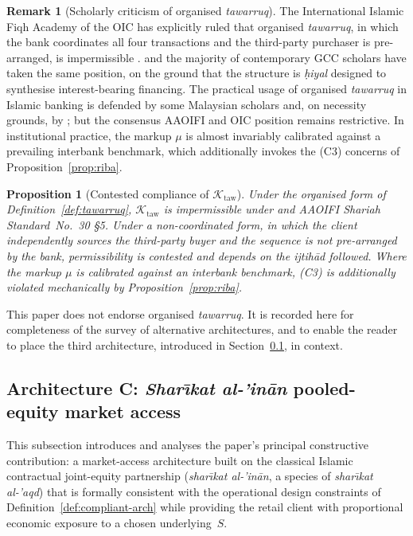 \documentclass[preprint,12pt,authoryear]{elsarticle}
\newtheorem{proposition}{Proposition}[section]
\theoremstyle{definition}
\newtheorem{remark}{Remark}[section]
\begin{document}
\begin{remark}[Scholarly criticism of organised \emph{tawarruq}]
\label{rem:tawarruq-criticism}
The International Islamic Fiqh Academy of the OIC has explicitly
ruled that organised \emph{tawarruq}, in which the bank
coordinates all four transactions and the third-party purchaser is
pre-arranged, is impermissible \citep{OICFiqh179}.
\citet{Usmani2002} and the majority of contemporary GCC scholars
have taken the same position, on the ground that the structure is
\emph{\d{h}iyal} designed to synthesise interest-bearing financing.
The practical usage of organised \emph{tawarruq} in Islamic banking
is defended by some Malaysian scholars and, on necessity grounds,
by \citet{AlSuwailem2006}; but the consensus AAOIFI and OIC
position remains restrictive. In institutional practice, the
markup $\mu$ is almost invariably calibrated against a prevailing
interbank benchmark, which additionally invokes the (C3)
concerns of Proposition~\ref{prop:riba}.
\end{remark}

\begin{proposition}[Contested compliance of
    $\mathcal{K}_{\text{taw}}$]
\label{prop:tawarruq-comply}
Under the organised form of Definition~\ref{def:tawarruq},
$\mathcal{K}_{\text{taw}}$ is impermissible under
\citet{OICFiqh179} and AAOIFI Shariah Standard~No.~30 \S5. Under a
non-coordinated form, in which the client independently sources
the third-party buyer and the sequence is not pre-arranged by the
bank, permissibility is contested and depends on the
\emph{ijtih\={a}d} followed. Where the markup $\mu$ is calibrated
against an interbank benchmark, (C3) is additionally violated
mechanically by Proposition~\ref{prop:riba}.
\end{proposition}

This paper does not endorse organised \emph{tawarruq}. It is
recorded here for completeness of the survey of alternative
architectures, and to enable the reader to place the third
architecture, introduced in Section~\ref{sec:alt-sharika}, in
context.

\subsection{Architecture C: \emph{Shar\={\i}kat al-'in\={a}n}
    pooled-equity market access}
\label{sec:alt-sharika}

This subsection introduces and analyses the paper's principal
constructive contribution: a market-access architecture built on the
classical Islamic contractual joint-equity partnership
(\emph{shar\={\i}kat al-'in\={a}n}, a species of
\emph{shar\={\i}kat al-'aqd}) that is formally consistent with the
operational design constraints of
Definition~\ref{def:compliant-arch} while providing the retail
client with proportional economic exposure to a chosen
underlying~$S$.
\end{document}
